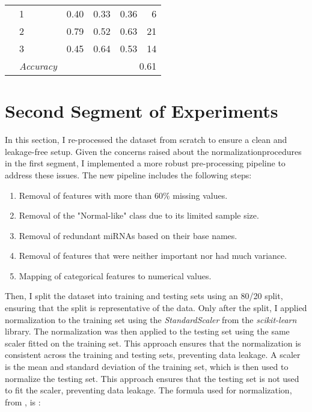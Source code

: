 \begin{table}
{\begin{tabular}{llrrrr}
                     & 1                 & 0.40                     & 0.33            & 0.36              & 6                \\
                     & 2                 & 0.79                     & 0.52            & 0.63              & 21               \\
                     & 3                 & 0.45                     & 0.64            & 0.53              & 14               \\
      \cmidrule{2-6}
                     & \textit{Accuracy} & \multicolumn{4}{r}{0.61}                                                          \\
      \bottomrule
    \end{tabular}
  }
\end{table}

\section{Second Segment of Experiments}
\label{sec:second_segment}

In this section, I re-processed the dataset from scratch to ensure a clean and
leakage-free setup. Given the concerns raised about the normalizationprocedures
in the first segment, I implemented a more robust pre-processing pipeline to
address these issues. The new pipeline includes the following steps:
\begin{enumerate}
  \item Removal of features with more than 60\% missing values.
  \item Removal of the "Normal-like" class due to its limited sample size.
  \item Removal of redundant miRNAs based on their base names.
  \item Removal of features that were neither important nor had much variance.
  \item Mapping of categorical features to numerical values.
\end{enumerate}

Then, I split the dataset into training and testing sets using an 80/20 split,
ensuring that the split is representative of the data. Only after the split, I
applied normalization to the training set using the \textit{StandardScaler}
from the \textit{scikit-learn} library. The normalization was then applied to
the testing set using the same scaler fitted on the training set. This approach
ensures that the normalization is consistent across the training and testing
sets, preventing data leakage. A scaler is the mean and standard deviation of
the training set, which is then used to normalize the testing set. This
approach ensures that the testing set is not used to fit the scaler, preventing
data leakage. The formula used for normalization, from
\textcite{sklearn_normalization}, is :

